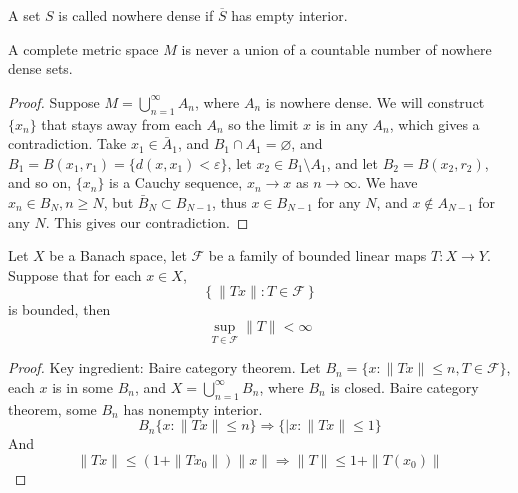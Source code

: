 \documentclass[openany]{book}
\let\emptyset\varnothing
\begin{document}
\begin{defn}
    A set $S$ is called nowhere dense if $\overline{S}$ has empty interior.
\end{defn}

\begin{prop}
    A complete metric space $M$ is never a union of a countable number of nowhere dense sets.
\end{prop}
\begin{proof}
    Suppose $M=\bigcup_{n=1}^\infty A_n$, where $A_n$ is nowhere dense. We will construct $\{x_n\}$ that stays away from each $A_n$ so the limit $x$ is in any $A_n$, which gives a contradiction. Take $x_1\in\bar{A}_1$, and $B_1\cap A_1=\emptyset$, and $B_1=B(x_1,r_1)=\{d(x,x_1)<\varepsilon\}$, let $x_2\in B_1\setminus A_1$, and let $B_2=B(x_2, r_2)$, and so on, $\{x_n\}$ is a Cauchy sequence, $x_n\to x$ as $n\to\infty$. We have $x_n\in B_N, n\geq N$, but $\bar{B}_N\subset B_{N-1}$, thus $x\in B_{N-1}$ for any $N$, and $x\not\in A_{N-1}$ for any $N$. This gives our contradiction.
\end{proof}

\begin{prop}[UBP]
    Let $X$ be a Banach space, let $\mathcal{F}$ be a family of bounded linear maps $T: X\to Y$. Suppose that for each $x\in X$,
    \begin{equation*}
        \left\{\|Tx\|: T\in\mathcal{F}\right\}
    \end{equation*}
    is bounded, then
    \begin{equation*}
        \sup_{T\in\mathcal{F}}\|T\|<\infty
    \end{equation*}
\end{prop}
\begin{proof}
    Key ingredient: Baire category theorem. Let $B_n=\{x: \|Tx\|\leq n, T\in\mathcal{F}\}$, each $x$ is in some $B_n$, and $X=\bigcup_{n=1}^\infty B_n$, where $B_n$ is closed. Baire category theorem, some $B_n$ has nonempty interior. 
    \begin{equation*}
        B_n\{x: \|Tx\|\leq n\}\Rightarrow \{|x: \|Tx\|\leq 1\}
    \end{equation*}
    And 
    \begin{equation*}
        \|Tx\|\leq(1+\|Tx_0\|)\|x\|\Rightarrow \|T\|\leq 1+\|T(x_0)\|
    \end{equation*}
\end{proof}

\end{document}
